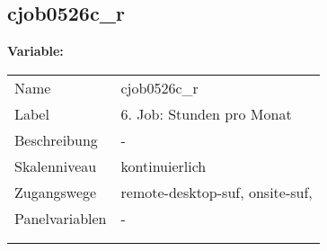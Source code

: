 	
	
	\subsection{cjob0526c\_r}
	\label{subSection:cjob0526c_r}

	\noindent\textbf{Variable:}\\
		\begin{tabular}{lL{11.3cm}}
			\label{tableVariable:cjob0526c_r}
			Name & cjob0526c\_r \\
			Label & 6. Job: Stunden pro Monat \\
			Beschreibung & - \\
			Skalenniveau & kontinuierlich \\
			Zugangswege &
				remote-desktop-suf,
				onsite-suf,
 \\
			Panelvariablen & -
			 \\
			 \\
 \\
		\end{tabular}





